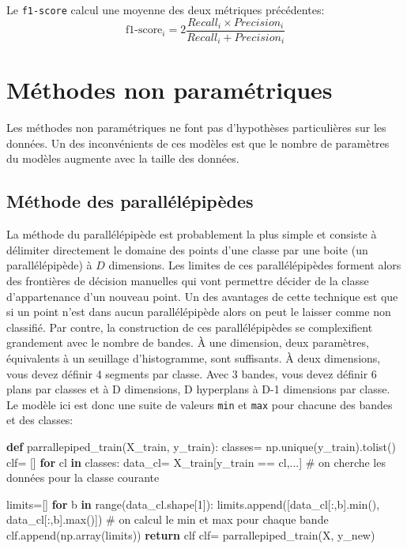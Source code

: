 \documentclass[
  11pt,
  letterpaper,
  open=any,
  twoside=false,
  french]{scrbook}
\newenvironment{Shaded}{\begin{snugshade}}{\end{snugshade}}
\newcommand{\BuiltInTok}[1]{\textcolor[rgb]{0.00,0.23,0.31}{#1}}
\newcommand{\CommentTok}[1]{\textcolor[rgb]{0.37,0.37,0.37}{#1}}
\newcommand{\ControlFlowTok}[1]{\textcolor[rgb]{0.00,0.23,0.31}{\textbf{#1}}}
\newcommand{\DecValTok}[1]{\textcolor[rgb]{0.68,0.00,0.00}{#1}}
\newcommand{\KeywordTok}[1]{\textcolor[rgb]{0.00,0.23,0.31}{\textbf{#1}}}
\newcommand{\NormalTok}[1]{\textcolor[rgb]{0.00,0.23,0.31}{#1}}
\newcommand{\OperatorTok}[1]{\textcolor[rgb]{0.37,0.37,0.37}{#1}}
\begin{document}
Le \texttt{f1-score} calcul une moyenne des deux métriques précédentes:
\[
\text{f1-score}_i=2\frac{Recall_i \times Precision_i}{Recall_i + Precision_i}
\]

\section{Méthodes non
paramétriques}\label{muxe9thodes-non-paramuxe9triques}

Les méthodes non paramétriques ne font pas d'hypothèses particulières
sur les données. Un des inconvénients de ces modèles est que le nombre
de paramètres du modèles augmente avec la taille des données.

\subsection{Méthode des parallélépipèdes}\label{sec-0511}

La méthode du parallélépipède est probablement la plus simple et
consiste à délimiter directement le domaine des points d'une classe par
une boite (un parallélépipède) à \(D\) dimensions. Les limites de ces
parallélépipèdes forment alors des frontières de décision manuelles qui
vont permettre décider de la classe d'appartenance d'un nouveau point.
Un des avantages de cette technique est que si un point n'est dans aucun
parallélépipède alors on peut le laisser comme non classifié. Par
contre, la construction de ces parallélépipèdes se complexifient
grandement avec le nombre de bandes. À une dimension, deux paramètres,
équivalents à un seuillage d'histogramme, sont suffisants. À deux
dimensions, vous devez définir 4 segments par classe. Avec 3 bandes,
vous devez définir 6 plans par classes et à D dimensions, D hyperplans à
D-1 dimensions par classe. Le modèle ici est donc une suite de valeurs
\texttt{min} et \texttt{max} pour chacune des bandes et des classes:

\begin{Shaded}
\begin{Highlighting}[]
\KeywordTok{def}\NormalTok{ parrallepiped\_train(X\_train, y\_train):}
\NormalTok{  classes}\OperatorTok{=}\NormalTok{ np.unique(y\_train).tolist()}
\NormalTok{  clf}\OperatorTok{=}\NormalTok{ []}
  \ControlFlowTok{for}\NormalTok{ cl }\KeywordTok{in}\NormalTok{ classes:}
\NormalTok{      data\_cl}\OperatorTok{=}\NormalTok{ X\_train[y\_train }\OperatorTok{==}\NormalTok{ cl,...] }\CommentTok{\# on cherche les données pour la classe courante}
      
\NormalTok{      limits}\OperatorTok{=}\NormalTok{[]}
      \ControlFlowTok{for}\NormalTok{ b }\KeywordTok{in} \BuiltInTok{range}\NormalTok{(data\_cl.shape[}\DecValTok{1}\NormalTok{]):}
\NormalTok{        limits.append([data\_cl[:,b].}\BuiltInTok{min}\NormalTok{(), data\_cl[:,b].}\BuiltInTok{max}\NormalTok{()]) }\CommentTok{\# on calcul le min et max pour chaque bande}
\NormalTok{      clf.append(np.array(limits))}
  \ControlFlowTok{return}\NormalTok{ clf}
\NormalTok{clf}\OperatorTok{=}\NormalTok{ parrallepiped\_train(X, y\_new)}
\end{Highlighting}
\end{Shaded}
\end{document}
